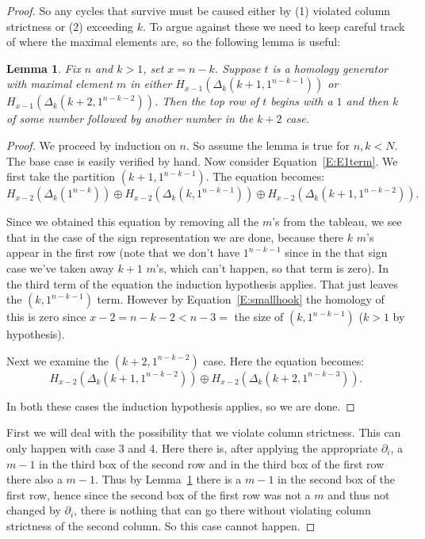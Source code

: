 \documentclass{amsart}
\newtheorem{lemma}[theorem]{Lemma}
\begin{document}
\begin{proof}
  So any cycles that survive must be caused either by (1) violated column strictness or (2) exceeding $k$. To argue against
  these we need to keep careful track of where the maximal elements are, so the following lemma is useful:

  \begin{lemma}\label{L:toprow}
    Fix $n$ and $k > 1$, set $x=n-k$. Suppose $t$ is a homology generator with maximal element $m$ in either 
    $H_{x-1}(\Delta_k(k+1, 1^{n-k-1}))$ or $H_{x-1}(\Delta_k(k+2, 1^{n-k-2}))$. Then the top row of $t$ begins with a $1$ 
    and then $k$ of some number followed by another number in the $k+2$ case. 
  \end{lemma}
  \begin{proof}
    We proceed by induction on $n$. So assume the lemma is true for $n, k < N$. The base case is easily verified by hand.
    Now consider Equation~\ref{E:E1term}. We first take the partition $(k+1, 1^{n-k-1})$. The equation becomes: 
    \begin{equation}\label{E:E1term-hookcase-1}
      H_{x-2}(\Delta_k(1^{n-k})) \oplus 
      H_{x-2}(\Delta_k(k, 1^{n-k-1})) \oplus H_{x-2}(\Delta_k(k+1, 1^{n-k-2})).
    \end{equation}

    Since we obtained this equation by removing all the $m$'s from the tableau, we see that in the case of the  sign 
    representation we are done, because there $k$ $m$'s appear in the first row (note that we don't have $1^{n-k-1}$ since
    in the that  sign case we've 
    taken away $k+1$ $m$'s, which can't happen, so that term is zero). In the third term of the equation the induction 
    hypothesis applies. That just leaves the $(k, 1^{n-k-1})$ term. However by 
    Equation~\ref{E:smallhook} the homology of this is zero since $x-2 = n-k -2 < n-3 = $ the size of $(k, 1^{n-k-1})$
    ($k>1$ by hypothesis).

    Next we examine the $(k+2, 1^{n-k-2})$ case. Here the equation becomes: 
    \begin{equation}\label{E:E1term-hookcase-2} 
      H_{x-2}(\Delta_k(k+1, 1^{n-k-2})) \oplus H_{x-2}(\Delta_k(k+2, 1^{n-k-3})).
    \end{equation}
     
    In both these cases the induction hypothesis applies, so we are done.
  \end{proof} 

  First we will deal with the possibility that we violate column strictness. This can only happen with case 3 and 4. Here
  there is, after applying the appropriate $\partial_i$,  a $m-1$ in the third box of the second row and in the third box 
  of the first row there also a $m-1$. Thus by Lemma~\ref{L:toprow} there is a $m-1$ in the second box of the first row, 
  hence since the second box of the first row was not a $m$ and thus not changed by $\partial_i$, there is nothing that can
  go there without violating column strictness of the second column. So this case cannot happen.


\end{proof}
\end{document}
